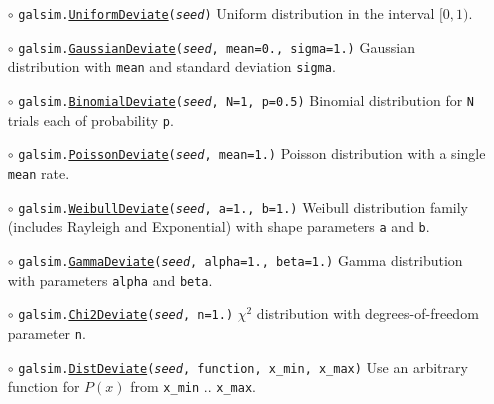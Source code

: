 \documentclass[preprint,10pt]{../../devel/modules/aastex}
\begin{document}
\begin{itemize}

  \item[$\circ$]
  \texttt{galsim.\href{http://galsim-developers.github.io/GalSim/classgalsim_1_1_uniform_deviate.html}{UniformDeviate}(\emph{seed})}
    \newline
    Uniform distribution in the interval $[0, 1)$.

  \item[$\circ$]
  \texttt{galsim.\href{http://galsim-developers.github.io/GalSim/classgalsim_1_1_gaussian_deviate.html}{GaussianDeviate}(\emph{seed}, mean=0., sigma=1.)}
    \newline
    Gaussian distribution with \texttt{mean} and standard deviation \texttt{sigma}.

  \item[$\circ$]
  \texttt{galsim.\href{http://galsim-developers.github.io/GalSim/classgalsim_1_1_binomial_deviate.html}{BinomialDeviate}(\emph{seed}, N=1, p=0.5)}
    \newline
    Binomial distribution for \texttt{N} trials each of probability \texttt{p}.

  \item[$\circ$]
  \texttt{galsim.\href{http://galsim-developers.github.io/GalSim/classgalsim_1_1_poisson_deviate.html}{PoissonDeviate}(\emph{seed}, mean=1.)}
    \newline
    Poisson distribution with a single \texttt{mean} rate.

  \item[$\circ$]
  \texttt{galsim.\href{http://galsim-developers.github.io/GalSim/classgalsim_1_1_weibull_deviate.html}{WeibullDeviate}(\emph{seed}, a=1., b=1.)}
    \newline
    Weibull distribution family (includes Rayleigh and Exponential) with shape parameters
    \texttt{a} and \texttt{b}.

  \item[$\circ$]
  \texttt{galsim.\href{http://galsim-developers.github.io/GalSim/classgalsim_1_1_gamma_deviate.html}{GammaDeviate}(\emph{seed}, alpha=1., beta=1.)}
    \newline
    Gamma distribution with parameters \texttt{alpha} and \texttt{beta}.

  \item[$\circ$]
  \texttt{galsim.\href{http://galsim-developers.github.io/GalSim/classgalsim_1_1_chi2_deviate.html}{Chi2Deviate}(\emph{seed}, n=1.)}
    \newline
    $\chi^2$ distribution with degrees-of-freedom parameter \texttt{n}.

  \item[$\circ$]
  \texttt{galsim.\href{http://galsim-developers.github.io/GalSim/classgalsim_1_1random_1_1_dist_deviate.html}{DistDeviate}(\emph{seed}, function, x\_min, x\_max)}
    \newline
    Use an arbitrary function for $P(x)$ from \texttt{x\_min} .. \texttt{x\_max}.

\end{itemize}
\end{document}
